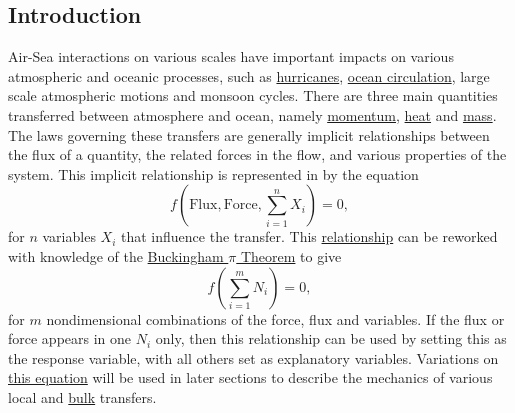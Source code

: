 \documentclass{report}
\begin{document}
 \subsection{Introduction} 
\label{intro}
 Air-Sea interactions on various scales have important impacts on various atmospheric and oceanic processes, such as \hyperref[hurricanes]{hurricanes}, \hyperref[circulation]{ocean circulation}, large scale atmospheric motions and monsoon cycles.
There are three main quantities transferred between atmosphere and ocean, namely  \hyperref[momentumtransfer]{momentum}, \hyperref[heattransfer]{heat} and \hyperref[masstransfer]{mass}.
The laws governing these transfers are generally implicit relationships between the flux of a quantity, the related forces in the flow, and various properties of the system.
This implicit relationship is represented in \citet{csanady04} by the equation
\begin{equation}
f\left(\mbox{Flux},\mbox{Force},\sum^n_{i=1} X_i \right) =0,
\label{eq:fluxforce}
\end{equation}
for $n$ variables $X_i$ that influence the transfer.
This \hyperref[eq:fluxforce]{relationship} can be reworked with knowledge of the \hyperref[def:buckingham]{Buckingham $\pi$ Theorem} to give
\begin{equation}
f\left(\sum^m_{i=1} N_i \right) =0,
\label{eq:fluxforce2}
\end{equation}
for $m$ nondimensional combinations of the force, flux and variables.
If the flux or force appears in one $N_i$ only, then this relationship can be used by setting this as the response variable, with all others set as explanatory variables.
Variations on \hyperref[eq:fluxforce2]{this equation} will be used in later sections to describe the mechanics of various local and \hyperref[def:bulk]{bulk} transfers.
\end{document}
